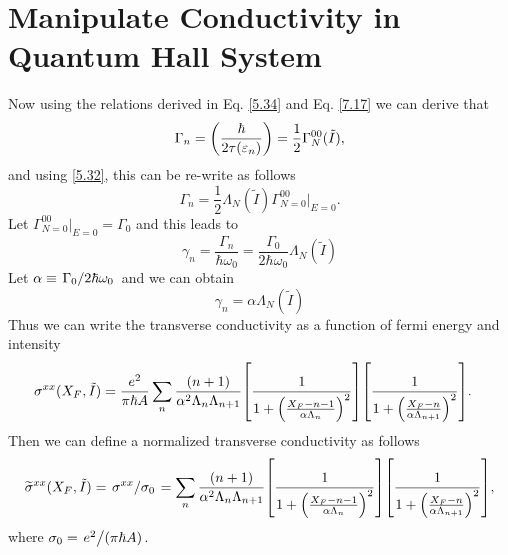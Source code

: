 \section{Manipulate Conductivity in Quantum Hall System}

Now using the relations derived in Eq. \eqref{5.34} and Eq. \eqref{7.17} we can derive that
\begin{equation} \label{8.1}
  \Gamma_n = \qty(\frac{\hbar }{2\tau(\varepsilon_n)}) =
  \frac{1}{2}\Gamma^{00}_{N}(\tilde{I}),
\end{equation}
and using \eqref{5.32}, this can be re-write as follows
\begin{equation} \label{8.2}
   \Gamma_n = \frac{1}{2} \Lambda_N (\tilde{I}) \Gamma^{00}_{N=0}\big|_{E=0}.
\end{equation}
Let $\Gamma^{00}_{N=0}\big|_{E=0} = \Gamma_0$ and this leads to
\begin{equation} \label{8.3}
   \gamma_n = \frac{\Gamma_n}{\hbar \omega_0} =
   \frac{\Gamma_0}{2\hbar \omega_0} \Lambda_N (\tilde{I})
\end{equation}
Let $\alpha \equiv \flatfrac{\Gamma_0}{2\hbar \omega_0}$ and we can obtain
\begin{equation} \label{8.4}
   \gamma_n = \alpha \Lambda_N (\tilde{I})
\end{equation}
Thus we can write the transverse conductivity as a function of fermi energy and intensity
\begin{equation} \label{8.5}
  \begin{aligned}
    \sigma^{xx}(X_F,\tilde{I}) & =
    \frac{e^2}{\pi\hbar A}
    \sum_{n}
    \frac{\qty(n+1)}{\alpha^2 \Lambda_n \Lambda_{n+1}}
    \qty[
      \frac{1}
      {
        1 + \qty(\frac{X_F - n -1}{\alpha\Lambda_n})^2
      }
    ]
    \qty[
      \frac{1}
      {
        1 + \qty(\frac{X_F - n}{\alpha\Lambda_{n+1}})^2
      }
    ].
  \end{aligned}
\end{equation}
Then we can define a normalized transverse conductivity as follows
\begin{equation} \label{8.6}
  \begin{aligned}
    \widetilde{\sigma}^{xx}(X_F,\tilde{I}) =
    \flatfrac{\sigma^{xx}}{\sigma_0} =
    \sum_{n}
    \frac{\qty(n+1)}{\alpha^2 \Lambda_n \Lambda_{n+1}}
    \qty[
      \frac{1}
      {
        1 + \qty(\frac{X_F - n -1}{\alpha\Lambda_n})^2
      }
    ]
    \qty[
      \frac{1}
      {
        1 + \qty(\frac{X_F - n}{\alpha\Lambda_{n+1}})^2
      }
    ],
  \end{aligned}
\end{equation}
where $\sigma_0 = \flatfrac{e^2}{(\pi\hbar A)}$.

